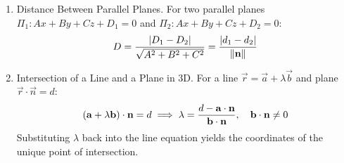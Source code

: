 \begin{enumerate}[label=\thesubsection.\arabic*, ref=\thesubsection.\theenumi]
		\item Distance Between Parallel Planes.
		For two parallel planes $\Pi_1: Ax + By + Cz + D_1 = 0$ and $\Pi_2: Ax + By + Cz + D_2 = 0$:
		\begin{align}
			D = \frac{\left\vert D_1 - D_2\right\vert}{\sqrt{A^2 + B^2 + C^2}} = \frac{\left\vert d_1 - d_2\right\vert}{\left\lVert\mathbf{n}\right\rVert} \label{eq:CBSE12-2019-parallel_planes_dist}
		\end{align}
		
		\item Intersection of a Line and a Plane in 3D.
		For a line $\vec{r} = \vec{a} + \lambda \vec{b}$ and plane $\vec{r} \cdot \vec{n} = d$:
		\begin{align}
			\left(\mathbf{a} + \lambda \mathbf{b}\right) \cdot \mathbf{n} = d \implies \lambda = \frac{d - \mathbf{a} \cdot \mathbf{n}}{\mathbf{b} \cdot \mathbf{n}}, \quad \mathbf{b} \cdot \mathbf{n} \neq 0 \label{eq:CBSE12-2019-line_plane_intersection}
		\end{align}
		Substituting $\lambda$ back into the line equation yields the coordinates of the unique point of intersection.
		
	\end{enumerate}
